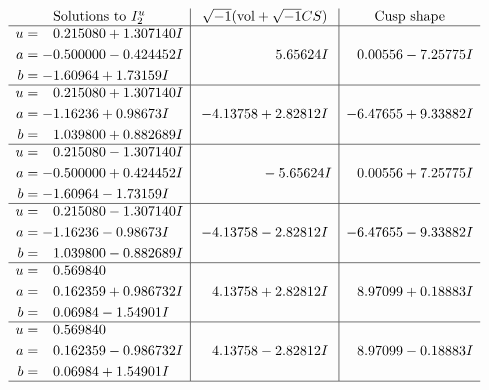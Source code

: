 \documentclass[1p]{elsarticle_modified}
\theoremstyle{definition}
\newcommand{\I}{\sqrt{-1}}
\begin{document}
$$\begin{array}{c|c|c}  
\text{Solutions to }I^u_{2}& \I (\text{vol} + \sqrt{-1}CS) & \text{Cusp shape}\\
 \hline 
\begin{aligned}
u &= \phantom{-}0.215080 + 1.307140 I \\
a &= -0.500000 - 0.424452 I \\
b &= -1.60964 + 1.73159 I\end{aligned}
 & \phantom{-0.000000 -}5.65624 I & \phantom{-}0.00556 - 7.25775 I \\ \hline\begin{aligned}
u &= \phantom{-}0.215080 + 1.307140 I \\
a &= -1.16236 + 0.98673 I \\
b &= \phantom{-}1.039800 + 0.882689 I\end{aligned}
 & -4.13758 + 2.82812 I & -6.47655 + 9.33882 I \\ \hline\begin{aligned}
u &= \phantom{-}0.215080 - 1.307140 I \\
a &= -0.500000 + 0.424452 I \\
b &= -1.60964 - 1.73159 I\end{aligned}
 & \phantom{-0.000000 } -5.65624 I & \phantom{-}0.00556 + 7.25775 I \\ \hline\begin{aligned}
u &= \phantom{-}0.215080 - 1.307140 I \\
a &= -1.16236 - 0.98673 I \\
b &= \phantom{-}1.039800 - 0.882689 I\end{aligned}
 & -4.13758 - 2.82812 I & -6.47655 - 9.33882 I \\ \hline\begin{aligned}
u &= \phantom{-}0.569840\phantom{ +0.000000I} \\
a &= \phantom{-}0.162359 + 0.986732 I \\
b &= \phantom{-}0.06984 - 1.54901 I\end{aligned}
 & \phantom{-}4.13758 + 2.82812 I & \phantom{-}8.97099 + 0.18883 I \\ \hline\begin{aligned}
u &= \phantom{-}0.569840\phantom{ +0.000000I} \\
a &= \phantom{-}0.162359 - 0.986732 I \\
b &= \phantom{-}0.06984 + 1.54901 I\end{aligned}
 & \phantom{-}4.13758 - 2.82812 I & \phantom{-}8.97099 - 0.18883 I\\
 \hline 
 \end{array}$$\newpage\newpage\renewcommand{\arraystretch}{1}
\end{document}
